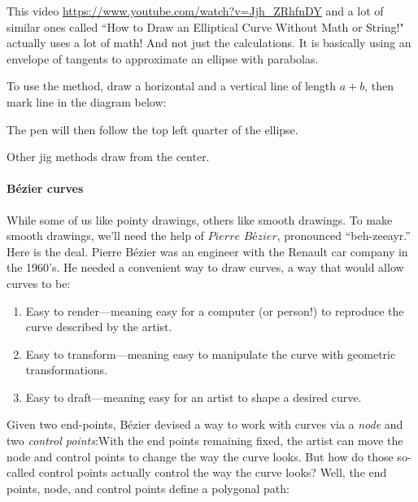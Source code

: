 \documentclass[noauthor,nooutcomes,hints,handout]{../ximera}
\begin{document}
This video \url{https://www.youtube.com/watch?v=Jjh_ZRhfnDY} and a lot of similar ones called ``How to Draw an Elliptical Curve Without Math or String!" actually uses a lot of math! And not just the calculations. It is basically using an envelope of tangents to approximate an ellipse with parabolas.
    
    To use the method, draw a horizontal and a vertical line of length $a+b$, then mark line in the diagram below: 
    
    
\begin{center}
\end{center}
    
The pen will then follow the top left quarter of the ellipse. 


Other jig methods draw from the center.



\paragraph{B\'ezier curves}

While some of us like pointy drawings, others like smooth drawings. To
make smooth drawings, we'll need the help of $\textit{Pierre
  B\'ezier}$, pronounced ``beh-zeeayr.'' Here is the deal.  Pierre
B\'ezier was an engineer with the Renault car company in the
1960's. He needed a convenient way to draw curves, a way that would
allow curves to be:
\begin{enumerate}
\item Easy to render---meaning easy for a computer (or person!) to
  reproduce the curve described by the artist.
\item Easy to transform---meaning easy to manipulate the curve with
  geometric transformations.
\item Easy to draft---meaning easy for an artist to shape a desired
  curve.
\end{enumerate}
Given two end-points, B\'ezier devised a way to work with
curves via a \textit{node} and two
\textit{control points}:With the end points remaining fixed, the artist can move the node and
control points to change the way the curve looks.  But how do those
so-called control points actually control the way the curve looks?
Well, the end points, node, and control points define a polygonal path:
\end{document}
